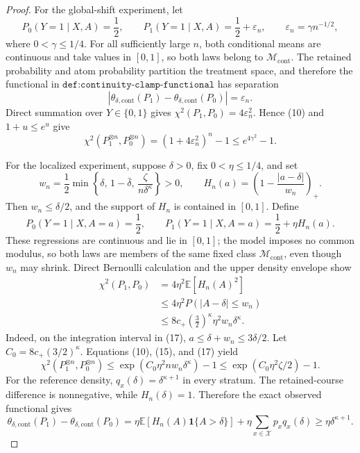 \documentclass{article}
\begin{document}
\begin{proof}
For the global-shift experiment, let
\[
 P_0(Y=1\mid X,A)=\frac12,
 \qquad
 P_1(Y=1\mid X,A)=\frac12+\varepsilon_n,
 \qquad
 \varepsilon_n=\gamma n^{-1/2}, \tag{12}
\]
where \(0<\gamma\leq1/4\).  For all sufficiently large \(n\), both conditional means are continuous and take values in \([0,1]\), so both laws belong to \(\mathcal M_{\mathrm{cont}}\).  The retained probability and atom probability partition the treatment space, and therefore the functional in \(\texttt{def:continuity-clamp-functional}\) has separation
\[
 |\theta_{\delta,\mathrm{cont}}(P_1)-
   \theta_{\delta,\mathrm{cont}}(P_0)|=\varepsilon_n. \tag{13}
\]
Direct summation over \(Y\in\{0,1\}\) gives \(\chi^2(P_1,P_0)=4\varepsilon_n^2\).  Hence (10) and \(1+u\leq e^u\) give
\[
 \chi^2(P_1^{\otimes n},P_0^{\otimes n})
 =(1+4\varepsilon_n^2)^n-1
 \leq e^{4\gamma^2}-1. \tag{14}
\]

For the localized experiment, suppose \(\delta>0\), fix \(0<\eta\leq1/4\), and set
\[
 w_n=\frac12\min\left\{\delta,\,1-\bar\delta,\,
             \frac{\zeta}{n\delta^\kappa}\right\}>0,
 \qquad
 H_n(a)=\left(1-\frac{|a-\delta|}{w_n}\right)_+. \tag{15}
\]
Then \(w_n\leq\delta/2\), and the support of \(H_n\) is contained in \([0,1]\).  Define
\[
 P_0(Y=1\mid X,A=a)=\frac12,
 \qquad
 P_1(Y=1\mid X,A=a)=\frac12+\eta H_n(a). \tag{16}
\]
These regressions are continuous and lie in \([0,1]\); the model imposes no common modulus, so both laws are members of the same fixed class \(\mathcal M_{\mathrm{cont}}\), even though \(w_n\) may shrink.  Direct Bernoulli calculation and the upper density envelope show
\[
\begin{aligned}
 \chi^2(P_1,P_0)
 &=4\eta^2\mathbb E[H_n(A)^2]\\
 &\leq4\eta^2P(|A-\delta|\leq w_n)\\
 &\leq 8c_+\left(\frac32\right)^\kappa
       \eta^2w_n\delta^\kappa.
\end{aligned}\tag{17}
\]
Indeed, on the integration interval in (17), \(a\leq\delta+w_n\leq3\delta/2\).  Let \(C_0=8c_+(3/2)^\kappa\).  Equations (10), (15), and (17) yield
\[
 \chi^2(P_1^{\otimes n},P_0^{\otimes n})
 \leq\exp(C_0\eta^2nw_n\delta^\kappa)-1
 \leq\exp(C_0\eta^2\zeta/2)-1. \tag{18}
\]
For the reference density, \(q_x(\delta)=\delta^{\kappa+1}\) in every stratum.  The retained-course difference is nonnegative, while \(H_n(\delta)=1\).  Therefore the exact observed functional gives
\[
 \theta_{\delta,\mathrm{cont}}(P_1)-
 \theta_{\delta,\mathrm{cont}}(P_0)
 =\eta\mathbb E[H_n(A)\mathbf 1\{A>\delta\}]
   +\eta\sum_{x\in\mathcal X}p_xq_x(\delta)
 \geq\eta\delta^{\kappa+1}. \tag{19}
\]


\end{proof}
\end{document}

